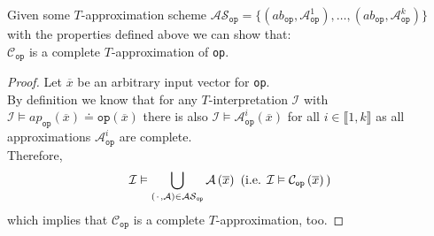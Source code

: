 \begin{lemma}
    \label{lemma:refinement_approach:abstraction_scheme:as_completeness}
Given some $T$-approximation scheme 
$\mathcal{AS}_{\texttt{op}} = \{ \left(ab_{\texttt{op}}, \mathcal{A}^1_{\texttt{op}}\right),\dots,\left(ab_{\texttt{op}}, \mathcal{A}^k_{\texttt{op}}\right) \}$
with the properties defined above we can show that:\\
$\mathcal{C}_{\texttt{op}}$ is a complete $T$-approximation of \texttt{op}.
\begin{proof}
Let $\overline{x}$ be an arbitrary input vector for \texttt{op}.\\
By definition we know that for any $T$-interpretation $\mathcal{I}$ with $\mathcal{I} \vDash ap_{\texttt{op}}\left(\overline{x}\right) \doteq \texttt{op}\left(\overline{x}\right)$ there is also $\mathcal{I} \vDash \mathcal{A}^i_{\texttt{op}}\left(\overline{x}\right)$ for all $i\in\llbracket1,k\rrbracket$ as all approximations $\mathcal{A}^i_{\texttt{op}}$ are complete.\\
Therefore,
\[
    \mathcal{I} \vDash \bigcup\limits_{\left({\mkern 2mu\cdot\mkern 2mu},\mathcal{A}\right)\in\mathcal{AS}_{\texttt{op}}} \mathcal{A}\left(\overline{x}\right)
    \text{ (i.e. }\mathcal{I} \vDash \mathcal{C}_{\texttt{op}}\left(\overline{x}\right)\text{)}
\]
which implies that $\mathcal{C}_{\texttt{op}}$ is a complete $T$-approximation, too.
\end{proof}
\end{lemma}

